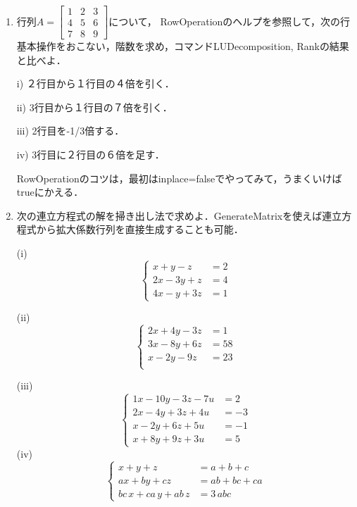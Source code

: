 \begin{enumerate}
\item 行列$A= \left[ \begin {array}{ccc} 1&2&3\\  4&5&6\\  7&8&9\end {array} \right]$について，
RowOperationのヘルプを参照して，次の行基本操作をおこない，階数を求め，コマンドLUDecomposition, Rankの結果と比べよ．

i) ２行目から１行目の４倍を引く．

ii) 3行目から１行目の７倍を引く．

iii) 2行目を-1/3倍する．

iv) 3行目に２行目の６倍を足す．

RowOperationのコツは，最初はinplace=falseでやってみて，うまくいけばtrueにかえる．

\item 
次の連立方程式の解を掃き出し法で求めよ．GenerateMatrixを使えば連立方程式から拡大係数行列を直接生成することも可能．

(i)
\begin{equation*}
\left\{
\begin{array}{cc}x +y -z &=2 \\
2 x -3 y +z &=4  \\
4 x -y +3 z &=1  
\end{array} \right.
\end{equation*}

(ii)
\begin{equation*}
\left\{
\begin{array}{cl}2 x +4 y -3 z &=1   \\
3 x -8 y +6 z &=58   \\
x -2 y -9 z &=23   \\
\end{array} \right.
\end{equation*}

(iii)
\begin{equation*}
\left\{
\begin{array}{cl}
1 x -10 y -3 z -7 u &=2   \\
2 x -4 y +3 z +4 u &=-3   \\
x -2 y +6 z +5 u &=-1   \\
x +8 y +9 z +3 u &=5
\end{array} \right.
\end{equation*}
(iv)
\begin{equation*}
\left\{\begin{array}{cl}x +y +z &=a +b +c    \\
ax+by+cz &=ab +bc +ca   \\
bc\,x +ca\,y + ab\,z &=3\,abc 
\end{array} \right.
\end{equation*}


\end{enumerate}
